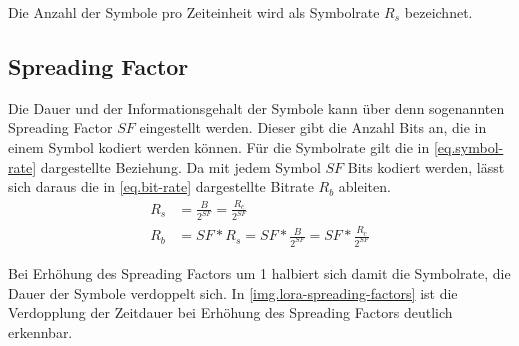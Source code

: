 Die Anzahl der Symbole pro Zeiteinheit wird als Symbolrate $R_s$ bezeichnet.


\subsection{Spreading Factor}
Die Dauer und der Informationsgehalt der Symbole kann über denn sogenannten Spreading Factor $SF$ eingestellt werden.
Dieser gibt die Anzahl Bits an, die in einem Symbol kodiert werden können.
Für die Symbolrate gilt die in \autoref{eq.symbol-rate} dargestellte Beziehung.
Da mit jedem Symbol $SF$ Bits kodiert werden, lässt sich daraus die in \autoref{eq.bit-rate} dargestellte Bitrate $R_b$ ableiten.
\cite[S. 10]{loramodulation}
\begin{align}
	R_s & = \frac{B}{2^{SF}} = \frac{R_c}{2^{SF}} \label{eq.symbol-rate}\\
	R_b & = SF * R_s = SF * \frac{B}{2^{SF}} = SF * \frac{R_c}{2^{SF}} \label{eq.bit-rate}
\end{align}

Bei Erhöhung des Spreading Factors um 1 halbiert sich damit die Symbolrate, die Dauer der Symbole verdoppelt sich.
In \autoref{img.lora-spreading-factors} ist die Verdopplung der Zeitdauer bei Erhöhung des Spreading Factors deutlich erkennbar.

